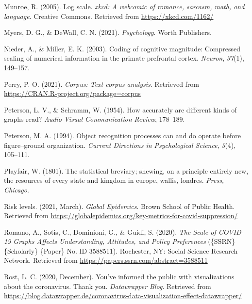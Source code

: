 \documentclass[print]{nuthesis}
\newlength{\cslhangindent}
\newenvironment{CSLReferences}%
{\setlength{\parindent}{0pt}%
\everypar{\setlength{\hangindent}{\cslhangindent}}\ignorespaces}%
{\par}
\begin{document}
\begin{CSLReferences}{1}{0}
\leavevmode{}%
Munroe, R. (2005). Log scale. \emph{xkcd: A webcomic of romance, sarcasm, math, and language}. Creative Commons. Retrieved from \url{https://xkcd.com/1162/}

\leavevmode{}%
Myers, D. G., \& DeWall, C. N. (2021). \emph{Psychology}. Worth Publishers.

\leavevmode{}%
Nieder, A., \& Miller, E. K. (2003). Coding of cognitive magnitude: Compressed scaling of numerical information in the primate prefrontal cortex. \emph{Neuron}, \emph{37}(1), 149--157.

\leavevmode{}%
Perry, P. O. (2021). \emph{Corpus: Text corpus analysis}. Retrieved from \url{https://CRAN.R-project.org/package=corpus}

\leavevmode{}%
Peterson, L. V., \& Schramm, W. (1954). How accurately are different kinds of graphs read? \emph{Audio Visual Communication Review}, 178--189.

\leavevmode{}%
Peterson, M. A. (1994). Object recognition processes can and do operate before figure--ground organization. \emph{Current Directions in Psychological Science}, \emph{3}(4), 105--111.

\leavevmode{}%
Playfair, W. (1801). The statistical breviary; shewing, on a principle entirely new, the resources of every state and kingdom in europe, wallis, londres. \emph{Press, Chicago}.

\leavevmode{}%
Risk levels. (2021, March). \emph{Global Epidemics}. Brown School of Public Health. Retrieved from \url{https://globalepidemics.org/key-metrics-for-covid-suppression/}

\leavevmode{}%
Romano, A., Sotis, C., Dominioni, G., \& Guidi, S. (2020). \emph{The {Scale} of {COVID}-19 {Graphs} {Affects} {Understanding}, {Attitudes}, and {Policy} {Preferences}} (\{SSRN\} \{Scholarly\} \{Paper\} No. ID 3588511). Rochester, NY: Social Science Research Network. Retrieved from \url{https://papers.ssrn.com/abstract=3588511}

\leavevmode{}%
Rost, L. C. (2020, December). You've informed the public with visualizations about the coronavirus. Thank you. \emph{Datawrapper Blog}. Retrieved from \url{https://blog.datawrapper.de/coronavirus-data-visualization-effect-datawrapper/}


\end{CSLReferences}
\end{document}
